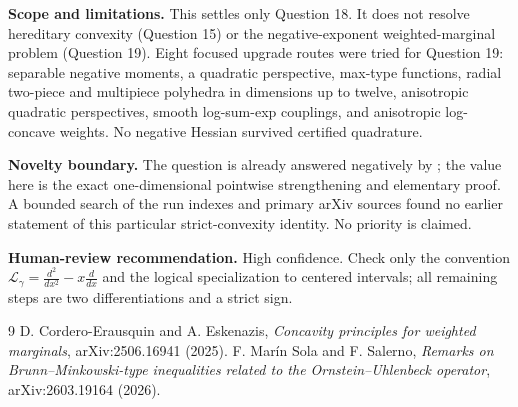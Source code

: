 \documentclass[10pt]{article}
\begin{document}
\noindent\textbf{Scope and limitations.}
This settles only Question 18.  It does not resolve hereditary convexity
(Question 15) or the negative-exponent weighted-marginal problem (Question
19).  Eight focused upgrade routes were tried for Question 19: separable
negative moments, a quadratic perspective, max-type functions, radial
two-piece and multipiece polyhedra in dimensions up to twelve, anisotropic
quadratic perspectives, smooth log-sum-exp couplings, and anisotropic
log-concave weights.  No negative Hessian survived certified quadrature.

\medskip
\noindent\textbf{Novelty boundary.}
The question is already answered negatively by \cite{MS}; the value here is
the exact one-dimensional pointwise strengthening and elementary proof.
A bounded search of the run indexes and primary arXiv sources found no earlier
statement of this particular strict-convexity identity.  No priority is
claimed.

\medskip
\noindent\textbf{Human-review recommendation.}
High confidence.  Check only the convention
$\mathcal L_\gamma=\frac{d^2}{dx^2}-x\frac d{dx}$ and the logical
specialization to centered intervals; all remaining steps are two
differentiations and a strict sign.

\begin{thebibliography}{9}
D. Cordero-Erausquin and A. Eskenazis,
\emph{Concavity principles for weighted marginals},
arXiv:2506.16941 (2025).
F. Mar\'in Sola and F. Salerno,
\emph{Remarks on Brunn--Minkowski-type inequalities related to the
Ornstein--Uhlenbeck operator},
arXiv:2603.19164 (2026).
\end{thebibliography}
\end{document}
